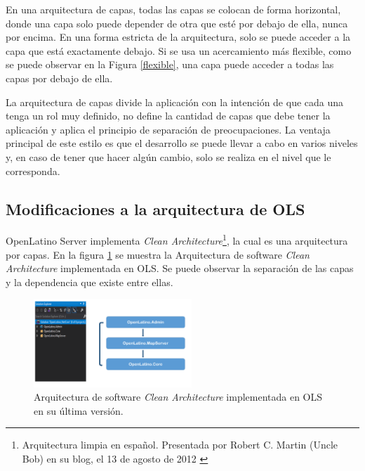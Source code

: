 En una arquitectura de capas, todas las capas se colocan de forma horizontal, donde una capa solo puede depender de otra que est\'e por debajo de ella, nunca por encima. En una forma estricta de la arquitectura, solo se puede acceder a la capa que est\'a exactamente debajo. Si se usa un acercamiento m\'as flexible, como se puede observar en la Figura \ref{flexible}, una capa puede acceder a todas las capas por debajo de ella. \cite{architecture}

La arquitectura de capas divide la aplicaci\'on con la intenci\'on de que cada una tenga un rol muy definido, no define la cantidad de capas que debe tener la aplicaci\'on y aplica el principio de separaci\'on de preocupaciones. La ventaja principal de este estilo es que el desarrollo se puede llevar a cabo en varios niveles y, en caso de tener que hacer alg\'un cambio, solo se realiza en el nivel que le corresponda.

\subsection{Modificaciones a la arquitectura de OLS}
OpenLatino Server implementa \textit{Clean Architecture}\footnote{Arquitectura limpia en espa\~nol. Presentada por Robert C. Martin (Uncle Bob) en su blog, el 13 de agosto de 2012 \cite{cleanArchitecture}}, la cual es una arquitectura por capas.  En la figura \ref{cleanArchitecture} se muestra la Arquitectura de software \textit{Clean Architecture} implementada en OLS. Se puede observar la separaci\'on de las capas y la dependencia que existe entre ellas.

\begin{figure} 
\vspace{-20pt} 
\begin{center} 
\includegraphics[width=0.53\textwidth]{images/cleanArchitecture.png} 
\end{center} \vspace{-20pt} \caption{Arquitectura de software \textit{Clean Architecture} implementada en OLS en su \'ultima versi\'on.} \label{cleanArchitecture} \vspace{-10pt} 
\end{figure}

